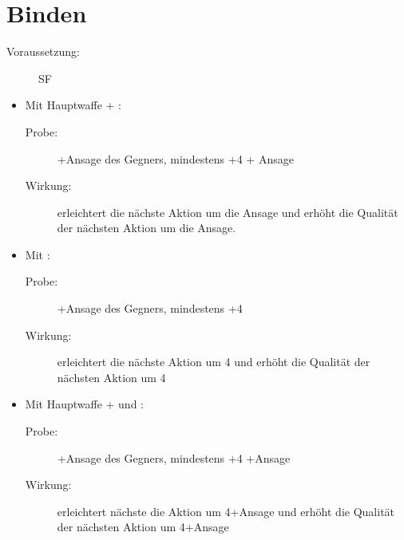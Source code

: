 \section{Binden}
\label{reaktion.binden}
\begin{description}
    \item[Voraussetzung:]
        SF 
\end{description}
\begin{itemize}
    \item
        Mit Hauptwaffe + :
        \begin{description}
            \item[Probe:]
                +Ansage des Gegners, mindestens +4 + Ansage
            \item[Wirkung:]
                erleichtert die nächste Aktion um die Ansage und erhöht die Qualität der nächsten Aktion um die Ansage.
        \end{description}
    \item
        Mit :
        \begin{description}
            \item[Probe:]
                +Ansage des Gegners, mindestens +4
            \item[Wirkung:]
                erleichtert die nächste Aktion um 4 und erhöht die Qualität der nächsten Aktion um 4
        \end{description}
    \item
        Mit Hauptwaffe +  und :
        \begin{description}
            \item[Probe:]
                +Ansage des Gegners, mindestens +4 +Ansage
            \item[Wirkung:]
                erleichtert nächste die Aktion um 4+Ansage und erhöht die Qualität der nächsten Aktion um 4+Ansage
        \end{description}
\end{itemize}

